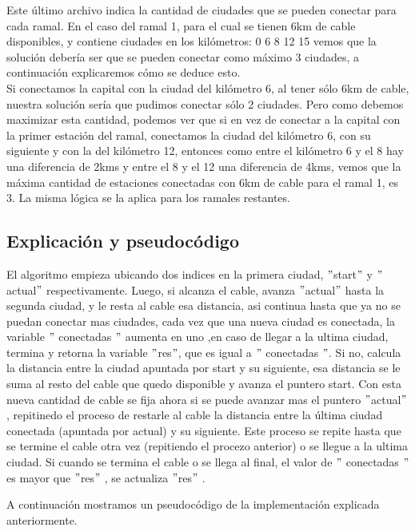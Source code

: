 Este último archivo indica la cantidad de ciudades que se pueden conectar para cada ramal. En el caso del ramal 1, para el cual se tienen 6km de cable disponibles, y contiene ciudades en los kilómetros: 0 6 8 12 15 vemos que la solución debería ser que se pueden conectar como máximo 3 ciudades, a continuación explicaremos cómo se deduce esto.\\

Si conectamos la capital con la ciudad del kilómetro 6, al tener sólo 6km de cable, nuestra solución sería que pudimos conectar sólo 2 ciudades. Pero como debemos maximizar esta cantidad, podemos ver que si en vez de conectar a la capital con la primer estación del ramal, conectamos la ciudad del kilómetro 6, con su siguiente y con la del kilómetro 12, entonces como entre el kilómetro 6 y el 8 hay una diferencia de 2kms y entre el 8 y el 12 una diferencia de 4kms, vemos que la máxima cantidad de estaciones conectadas con 6km de cable para el ramal 1, es 3. La misma lógica se la aplica para los ramales restantes.\\

\subsection{Explicación y pseudocódigo}

El algoritmo empieza ubicando dos indices en la primera ciudad, $"$start$"$ y $"$actual$"$ respectivamente. Luego, si alcanza el cable, avanza $"$actual$"$ hasta la segunda ciudad, y le resta al cable esa distancia, asi continua hasta que ya no se puedan conectar mas ciudades, cada vez que una nueva ciudad es conectada, la variable $"$ conectadas $"$ aumenta en uno ,en caso de llegar a la ultima ciudad, termina y retorna la variable $"$res$"$, que es igual a $"$ conectadas $"$. Si no, calcula la distancia entre la ciudad apuntada por start y su siguiente, esa distancia se le suma al resto del cable que quedo disponible y avanza el puntero start. Con esta nueva cantidad de cable se fija ahora si se puede avanzar mas el puntero $"$actual$"$ , repitinedo el proceso de restarle al cable la distancia entre la última ciudad conectada (apuntada por actual) y su siguiente. Este proceso se repite hasta que se termine el cable otra vez (repitiendo el procezo anterior) o se llegue a la ultima ciudad. Si cuando se termina el cable o se llega al final, el valor de $"$ conectadas $"$ es mayor que $"$res$"$ , se actualiza $"$res$"$ .

A continuación mostramos un pseudocódigo de la implementación explicada anteriormente. \\

